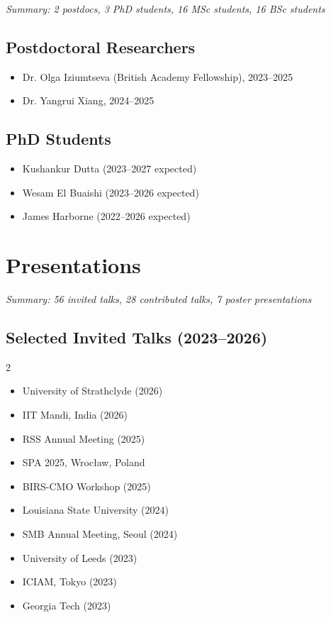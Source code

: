 \documentclass[11pt,a4paper,sans]{moderncv}
\begin{document}
\textit{Summary: 2 postdocs, 3 PhD students, 16 MSc students, 16 BSc students}

\subsection{Postdoctoral Researchers}
\begin{itemize}
    \item Dr. Olga Iziumtseva (British Academy Fellowship), 2023--2025
    \item Dr. Yangrui Xiang, 2024--2025
\end{itemize}

\subsection{PhD Students}
\begin{itemize}
    \item Kushankur Dutta (2023--2027 expected)
    \item Wesam El Buaishi (2023--2026 expected)
    \item James Harborne (2022--2026 expected)
\end{itemize}

\section{ Presentations}

\textit{Summary: 56 invited talks, 28 contributed talks, 7 poster presentations}

\subsection{Selected Invited Talks (2023--2026)}
\begin{multicols}{2}
\begin{itemize}
    \item University of Strathclyde (2026)
    \item IIT Mandi, India (2026)
    \item RSS Annual Meeting (2025)
    \item SPA 2025, Wrocław, Poland
    \item BIRS-CMO Workshop (2025)
    \item Louisiana State University (2024)
    \item SMB Annual Meeting, Seoul (2024)
    \item University of Leeds (2023)
    \item ICIAM, Tokyo (2023)
    \item Georgia Tech (2023)
\end{itemize}
\end{multicols}
\end{document}
